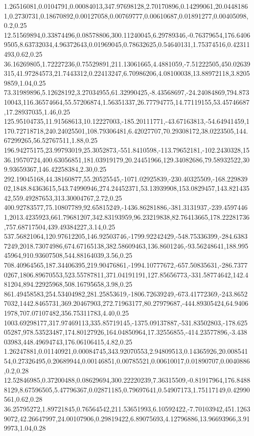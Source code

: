 1.26516081,0.0104791,0.00084013,347.97698128,2.70170896,0.14299061,20.04481861,0.2730731,0.18670892,0.00127058,0.00769777,0.00610687,0.01891277,0.00405098,0.2,0.25
12.51569894,0.33874496,0.08578806,300.11240045,6.29789346,-0.76379654,176.64069505,8.63732034,4.96372643,0.01969045,0.78632625,0.54640131,1.75374516,0.42311493,0.62,0.25
36.16269805,1.72227236,0.75529891,211.13061665,4.4881059,-7.51222505,450.02639315,41.97284573,21.7443312,0.22413247,6.70986206,4.08100038,13.88972118,3.82059859,1.04,0.25
73.31989896,5.12628192,3.27034955,61.32990425,-8.43568697,-24.24084869,794.87310043,116.36574664,55.57206874,1.56351337,26.77794775,14.77119155,53.45746687,17.28937035,1.46,0.25
125.95104735,11.91568613,10.12227003,-185.20111771,-43.67163813,-54.64941459,1170.72718718,240.24025501,108.79306481,6.42027707,70.29308172,38.0223505,144.67299265,56.52767511,1.88,0.25
196.94275175,23.99793019,25.3052873,-551.8410598,-113.79652181,-102.2430328,1536.19570724,400.63056851,181.03919179,20.24451966,129.34082686,79.58932522,309.93659367,146.42258384,2.30,0.25
292.19045168,44.38160877,55.20525545,-1071.02925839,-230.40325509,-168.22983902,1848.84363615,543.74990946,274.24452371,53.13939908,153.0829457,143.82143542,559.49287653,313.30004767,2.72,0.25
400.92783577,75.10807789,92.65815249,-1436.86281886,-381.3131937,-239.45974461,2013.4235923,661.79681207,342.83193959,96.23219838,82.76413665,178.22281736,757.68717504,439.49384227,3.14,0.25
537.56821064,120.97612205,146.92503746,-1799.92242429,-548.75336399,-284.63837249,2018.73074986,674.67165138,382.58609463,136.8601246,-93.56248641,188.99545964,910.93607508,544.88164039,3.56,0.25
708.40964565,187.34406395,219.90476861,-1994.10777672,-657.50835631,-286.73770267,1806.89670553,523.55787811,371.04191191,127.85656773,-331.58774642,142.481204,894.22925968,508.16795658,3.98,0.25
861.49458583,254.53404982,281.25853619,-1806.72639249,-673.41772369,-243.86527032,1442.8465731,369.20467903,272.71963177,80.27979687,-444.89305424,64.94061978,707.07107482,356.75311783,4.40,0.25
1003.69298177,317.97469113,335.85719145,-1375.09137887,-531.83502803,-178.62505287,978.53523487,174.80127926,164.04850964,17.32556855,-414.23577896,-3.43803983,448.49694743,176.06106415,4.82,0.25
1.26247881,0.01140921,0.00084745,343.92070553,2.94809513,0.14365926,20.00854154,0.27326495,0.20689944,0.00146851,0.00785521,0.00610017,0.01890707,0.0040886,0.2,0.28
12.52846985,0.37200488,0.08629694,300.22220239,7.36315509,-0.81917964,176.84888129,8.67596505,5.47796367,0.02871185,0.79697641,0.54907173,1.75117149,0.42990561,0.62,0.28
36.25795272,1.89721845,0.76564542,211.53651993,6.10592422,-7.70103942,451.12639072,42.26647997,24.00107906,0.29819422,6.89075693,4.12796886,13.96693966,3.919973,1.04,0.28
